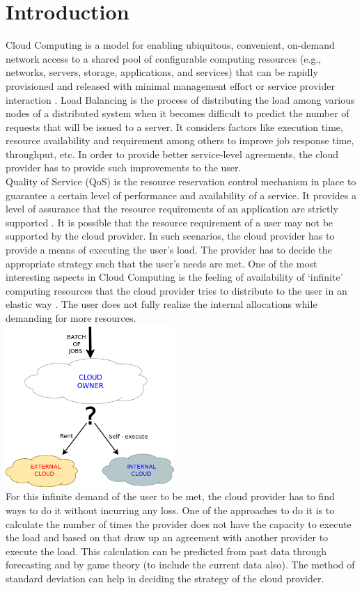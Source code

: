 \documentclass[conference]{IEEEtran}
\begin{document}
\section{Introduction}
Cloud Computing is a model for enabling ubiquitous, convenient, on-demand network access to a shared pool of configurable computing resources (e.g., networks, servers, storage, applications, and services) that can be rapidly provisioned and released with minimal management effort or service provider interaction \cite{NIST}. Load Balancing is the process of distributing the load among various nodes of a distributed system when it becomes difficult to predict the number of requests that will be issued to a server. It considers factors like execution time, resource availability and requirement among others to improve job response time, throughput, etc. In order to provide better service-level agreements, the cloud provider has to provide such improvements to the user.\\[0.2cm]
Quality of Service (QoS) is the resource reservation control mechanism in place to guarantee a certain level of performance and availability of a service. It provides a level of assurance that the resource requirements of an application are strictly supported \cite{QOS}. It is possible that the resource requirement of a user may not be supported by the cloud provider. In such 
scenarios, the cloud provider has to provide a means of executing the user's load. The provider has to decide the appropriate strategy such that the user's needs are met. One of the most interesting aspects in Cloud Computing is the feeling of availability of `infinite' computing resources that the cloud provider tries to distribute to the user in an elastic way \cite{RAD}. The user does not fully realize the internal allocations while demanding for more resources.\\[0.3cm]
\includegraphics[width=0.48\textwidth]{Diagram1}\\[0.3cm]
For this infinite demand of the user to be met, the cloud provider has to find ways to do it without incurring any loss. One of the approaches to do it is to calculate the number of times the provider does not have the capacity to execute the load and based on that draw up an agreement with another provider to execute the load. This calculation can be predicted from past data through forecasting and by game theory (to include the current data also). The method of standard deviation can help in deciding the strategy of the cloud provider.
\end{document}

